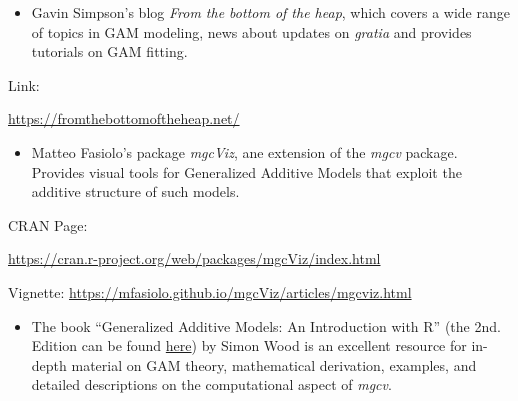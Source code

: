 \documentclass[
]{article}
\providecommand{\tightlist}{%
  \setlength{\itemsep}{0pt}\setlength{\parskip}{0pt}}
\begin{document}
\begin{itemize}
\tightlist
\item
  Gavin Simpson's blog \emph{From the bottom of the heap}, which covers a wide range of topics in GAM modeling, news about updates on \emph{gratia} and provides tutorials on GAM fitting.
\end{itemize}

Link:

\url{https://fromthebottomoftheheap.net/}

\begin{itemize}
\tightlist
\item
  Matteo Fasiolo's package \emph{mgcViz}, ane extension of the \emph{mgcv} package. Provides visual tools for Generalized Additive Models that exploit the additive structure of such models.
\end{itemize}

CRAN Page:

\url{https://cran.r-project.org/web/packages/mgcViz/index.html}

Vignette:
\url{https://mfasiolo.github.io/mgcViz/articles/mgcviz.html}

\begin{itemize}
\tightlist
\item
  The book ``Generalized Additive Models: An Introduction with R'' (the 2nd. Edition can be found \href{https://www.routledge.com/Generalized-Additive-Models-An-Introduction-with-R-Second-Edition/Wood/p/book/9781498728331}{here}) by Simon Wood is an excellent resource for in-depth material on GAM theory, mathematical derivation, examples, and detailed descriptions on the computational aspect of \emph{mgcv}.
\end{itemize}
\end{document}
